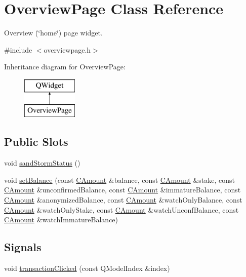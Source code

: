 \hypertarget{class_overview_page}{}\section{Overview\+Page Class Reference}
\label{class_overview_page}


Overview (\char`\"{}home\char`\"{}) page widget.  




{\ttfamily \#include $<$overviewpage.\+h$>$}

Inheritance diagram for Overview\+Page\+:\begin{figure}[H]
\begin{center}
\leavevmode
\includegraphics[height=2.000000cm]{class_overview_page}
\end{center}
\end{figure}
\subsection*{Public Slots}
\begin{DoxyCompactItemize}
\item 
void \hyperlink{class_overview_page_a95da1abd608bd2412b668be43446295a}{sand\+Storm\+Status} ()
\item 
void \hyperlink{class_overview_page_a070a269ea7c7aacf129e6325fcd8343a}{set\+Balance} (const \hyperlink{amount_8h_a4eaf3a5239714d8c45b851527f7cb564}{C\+Amount} \&balance, const \hyperlink{amount_8h_a4eaf3a5239714d8c45b851527f7cb564}{C\+Amount} \&stake, const \hyperlink{amount_8h_a4eaf3a5239714d8c45b851527f7cb564}{C\+Amount} \&unconfirmed\+Balance, const \hyperlink{amount_8h_a4eaf3a5239714d8c45b851527f7cb564}{C\+Amount} \&immature\+Balance, const \hyperlink{amount_8h_a4eaf3a5239714d8c45b851527f7cb564}{C\+Amount} \&anonymized\+Balance, const \hyperlink{amount_8h_a4eaf3a5239714d8c45b851527f7cb564}{C\+Amount} \&watch\+Only\+Balance, const \hyperlink{amount_8h_a4eaf3a5239714d8c45b851527f7cb564}{C\+Amount} \&watch\+Only\+Stake, const \hyperlink{amount_8h_a4eaf3a5239714d8c45b851527f7cb564}{C\+Amount} \&watch\+Unconf\+Balance, const \hyperlink{amount_8h_a4eaf3a5239714d8c45b851527f7cb564}{C\+Amount} \&watch\+Immature\+Balance)
\end{DoxyCompactItemize}
\subsection*{Signals}
\begin{DoxyCompactItemize}
\item 
void \hyperlink{class_overview_page_aa75e17f571b13dfcdd6f5251cbfe966d}{transaction\+Clicked} (const Q\+Model\+Index \&index)
\end{DoxyCompactItemize}
